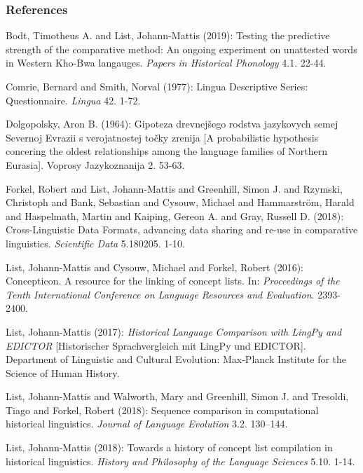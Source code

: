 \documentclass[
  a4paper,
  14pt,
  oneside,
  tablecaptionabove
]{scrbook}
\begin{document}
\subsubsection*{References}

\nopagebreak\hangindent=0.7cm {\small  Bodt, Timotheus A. and List, Johann-Mattis (2019): Testing the
predictive strength of the comparative method: An ongoing experiment on
unattested words in Western Kho-Bwa langauges. \emph{Papers in Historical
Phonology} 4.1. 22-44. }

\nopagebreak\hangindent=0.7cm {\small  Comrie, Bernard and Smith, Norval (1977): Lingua Descriptive Series:
Questionnaire. \emph{Lingua} 42. 1-72. }

\nopagebreak\hangindent=0.7cm {\small  Dolgopolsky, Aron B. (1964): Gipoteza drevnejšego rodstva jazykovych
semej Severnoj Evrazii s verojatnostej točky zrenija {[}A probabilistic
hypothesis concering the oldest relationships among the language
families of Northern Eurasia{]}. Voprosy Jazykoznanija 2. 53-63.}

\nopagebreak\hangindent=0.7cm {\small  Forkel, Robert and List, Johann-Mattis and Greenhill, Simon J. and
Rzymski, Christoph and Bank, Sebastian and Cysouw, Michael and
Hammarström, Harald and Haspelmath, Martin and Kaiping, Gereon A. and
Gray, Russell D. (2018): Cross-Linguistic Data Formats, advancing data
sharing and re-use in comparative linguistics. \emph{Scientific Data} 5.180205.
1-10.}

\nopagebreak\hangindent=0.7cm {\small  List, Johann-Mattis and Cysouw, Michael and Forkel, Robert (2016):
Concepticon. A resource for the linking of concept lists. In:
\emph{Proceedings of the Tenth International Conference on Language Resources
and Evaluation}. 2393-2400.}

\nopagebreak\hangindent=0.7cm {\small  List, Johann-Mattis (2017): \emph{Historical Language Comparison with
LingPy and EDICTOR} {[}Historischer Sprachvergleich mit LingPy und
EDICTOR{]}. Department of Linguistic and Cultural Evolution: Max-Planck
Institute for the Science of Human History.}

\nopagebreak\hangindent=0.7cm {\small  List, Johann-Mattis and Walworth, Mary and Greenhill, Simon J. and
Tresoldi, Tiago and Forkel, Robert (2018): Sequence comparison in
computational historical linguistics. \emph{Journal of Language Evolution} 3.2.
130--144. }

\nopagebreak\hangindent=0.7cm {\small  List, Johann-Mattis (2018): Towards a history of concept list
compilation in historical linguistics. \emph{History and Philosophy of the
Language Sciences} 5.10. 1-14. }
\end{document}
